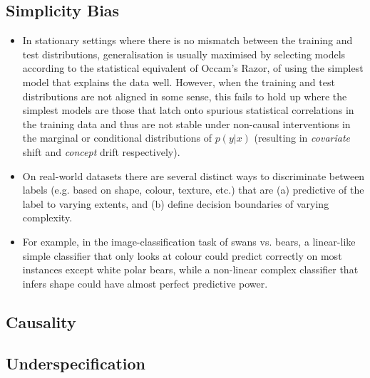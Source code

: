 \subsection{Simplicity Bias \citep{shah2020pitfalls}}
\begin{itemize}
  \item In stationary settings where there is no mismatch between the training and test 
    distributions, generalisation is usually maximised by selecting models according to the 
    statistical equivalent of Occam's Razor, of using the simplest model that explains the data 
    well. However, when the training and test distributions are not aligned in some sense, this 
    fails to hold up where the simplest models are those that latch onto spurious statistical 
    correlations in the training data and thus are not stable under non-causal interventions in 
    the marginal or conditional distributions of $p(y|x)$ (resulting in \emph{covariate} shift 
    and \emph{concept} drift respectively).
  \item On real-world datasets there are several distinct ways to discriminate between labels (e.g. 
    based on shape, colour, texture, etc.) that are (a) predictive of the label to varying extents, 
    and (b) define decision boundaries of varying complexity. 
  \item For example, in the image-classification task of swans vs. bears, a linear-like simple 
    classifier that only looks at colour could predict correctly on most instances except white 
    polar bears, while a non-linear complex classifier that infers shape could have almost perfect 
    predictive power.
\end{itemize}

\subsection{Causality}%
\subsection{Underspecification}%
\label{sub:underspecification}

